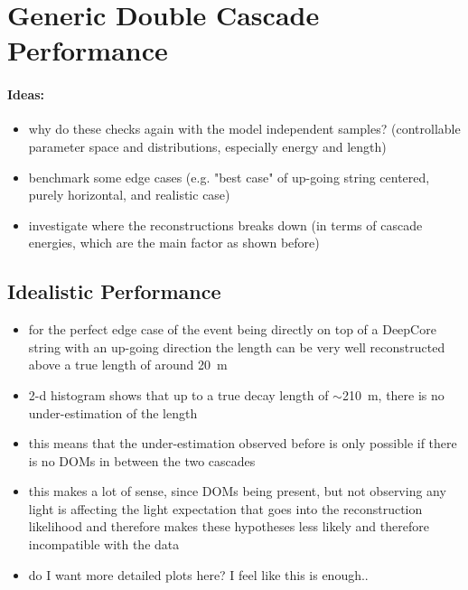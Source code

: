 \section{Generic Double Cascade Performance}


\paragraph{Ideas:}
\begin{itemize}
    \item why do these checks again with the model independent samples? (controllable parameter space and distributions, especially energy and length)
    \item benchmark some edge cases (e.g. "best case" of up-going string centered, purely horizontal, and realistic case)
    \item investigate where the reconstructions breaks down (in terms of cascade energies, which are the main factor as shown before)
\end{itemize}

\subsection{Idealistic Performance}

\begin{itemize}
    \item for the perfect edge case of the event being directly on top of a DeepCore string with an up-going direction the length can be very well reconstructed above a true length of around \SI{20}{\meter}
    \item 2-d histogram shows that up to a true decay length of $\sim$\SI{210}{\meter}, there is no under-estimation of the length
    \item this means that the under-estimation observed before is only possible if there is no DOMs in between the two cascades
    \item this makes a lot of sense, since DOMs being present, but not observing any light is affecting the light expectation that goes into the reconstruction likelihood and therefore makes these hypotheses less likely and therefore incompatible with the data
    \item do I want more detailed plots here? I feel like this is enough.. 
\end{itemize}

